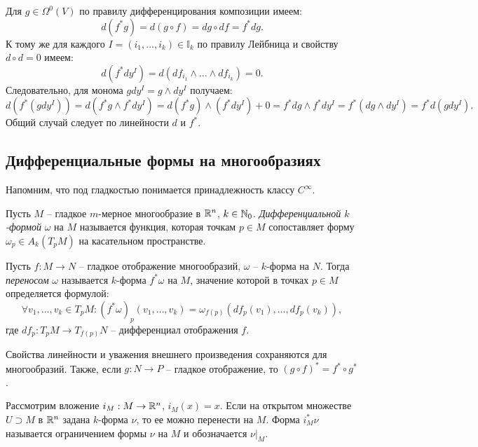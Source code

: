 \begin{myproof}
	Для $g \in \Omega^0(V)$ по правилу дифференцирования композиции имеем: 
	\[ d(f^* g) = d(g \circ f) = dg \circ df = f^* dg. \]
	К тому же для каждого $I = (i_1, \dotsc, i_k) \in \mathbb{I}_k$ по правилу Лейбница и свойству $d \circ d = 0$ имеем: 
	\[ d(f^* dy^I) = d(df_{i_1} \wedge \dotsc \wedge df_{i_k}) = 0. \] 
	Следовательно, для монома $g dy^I = g \wedge dy^I$ получаем:
	\[ d (f^* (g dy^I) ) = d (f^* g \wedge f^* dy^I) = d(f^* g) \wedge (f^* dy^I) + 0 = f^* dg \wedge f^* dy^I = f^* (dg \wedge dy^I) = f^* d(g dy^I). \]
	Общий случай следует по линейности $d$ и $f^*$.
\end{myproof}


\subsection{Дифференциальные формы на многообразиях} 

Напомним, что под гладкостью понимается принадлежность классу $C^{\infty}$. 

\begin{definition}
	Пусть $M$ -- гладкое $m$-мерное многообразие в $\mathbb{R}^n$, $k \in \mathbb{N}_0$. 
	\textit{Дифференциальной $k$-формой} $\omega$ на $M$ называется функция, которая точкам $p \in M$ сопоставляет форму $\omega_p \in A_k(T_p M)$ на касательном пространстве. 
\end{definition}

\begin{definition}
	Пусть $f : M \to N$ -- гладкое отображение многообразий, $\omega$ -- $k$-форма на $N$. 
	Тогда \textit{переносом} $\omega$ называется $k$-форма $f^* \omega$ на $M$, значение которой в точках $p \in M$ определяется формулой:
	\[ \forall v_1, \dotsc, v_k \in T_p M : (f^* \omega)_p (v_1, \dotsc, v_k) = \omega_{f(p)} (df_p(v_1), \dotsc, df_p(v_k)), \]
	где $df_p : T_p M \to T_{f(p)} N$ -- дифференциал отображения $f$.
\end{definition}

\begin{note}
    Свойства линейности и уважения внешнего произведения сохраняются для многообразий.
	Также, если $g : N \to P$ -- гладкое отображение, то $(g \circ f)^* = f^* \circ g^*$.  
\end{note}

\begin{example}
	Рассмотрим вложение $i_M : M \to \mathbb{R}^n$, $i_M(x) = x$. 
	Если на открытом множестве $U \supset M$ в $\mathbb{R}^n$ задана $k$-форма $\nu$, то ее можно перенести на $M$.
	Форма $i^*_M \nu$ называется ограничением формы $\nu$ на $M$ и обозначается $\nu|_M$.
\end{example}

